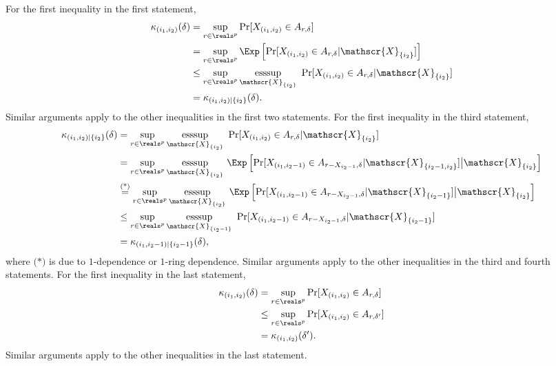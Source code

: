 \documentclass[aos]{imsart}
\begin{document}
\begin{appendix}
For the first inequality in the first statement,
\begin{equation*}
\begin{aligned}
    \kappa_{(i_1,i_2)}(\delta) 
    & = \sup_{r\in\reals^p} \Pr[{X}_{(i_1,i_2)} \in A_{r,\delta}] \\
    & = \sup_{r\in\reals^p} \Exp\left[ \Pr[{X}_{(i_1,i_2)} \in A_{r,\delta} | \mathscr{X}_{\{i_2\}}] \right] \\
    & \leq \sup_{r\in\reals^p} \underset{\mathscr{X}_{\{i_2\}}}{\mathrm{esssup}}
    ~ \Pr[{X}_{(i_1,i_2)} \in A_{r,\delta} | \mathscr{X}_{\{i_2\}}] \\
    & = \kappa_{(i_1,i_2)|\{i_2\}}(\delta). \\
\end{aligned}
\end{equation*}
Similar arguments apply to the other inequalities in the first two statements.
%
For the first inequality in the third statement,
\begin{equation*}
\begin{aligned}
    \kappa_{(i_1,i_2)|\{i_2\}}(\delta) 
    & = \sup_{r\in\reals^p} \underset{\mathscr{X}_{\{i_2\}}}{\mathrm{esssup}}
    ~ \Pr[{X}_{(i_1,i_2)} \in A_{r,\delta} | \mathscr{X}_{\{i_2\}}] \\
    & = \sup_{r\in\reals^p} \underset{\mathscr{X}_{\{i_2\}}}{\mathrm{esssup}}
    ~ \Exp\left[ 
        \Pr[{X}_{(i_1,i_2-1)} \in A_{r - X_{i_2-1},\delta} 
        | \mathscr{X}_{\{i_2-1, i_2\}}] 
    \big| \mathscr{X}_{\{i_2\}} \right] \\
    & \overset{\text{(*)}}{=} \sup_{r\in\reals^p} \underset{\mathscr{X}_{\{i_2\}}}{\mathrm{esssup}}
    ~ \Exp\left[ 
        \Pr[{X}_{(i_1,i_2-1)} \in A_{r - X_{i_2-1},\delta} 
        | \mathscr{X}_{\{i_2-1\}}] 
    \big| \mathscr{X}_{\{i_2\}} \right] \\
    & \leq \sup_{r\in\reals^p} 
    \underset{\mathscr{X}_{\{i_2-1\}}}{\mathrm{esssup}}
    ~ \Pr[{X}_{(i_1,i_2-1)} \in A_{r - X_{i_2-1},\delta} 
    | \mathscr{X}_{\{i_2-1\}}]  \\
    & = \kappa_{(i_1,i_2-1)|\{i_2-1\}}(\delta), \\
\end{aligned}
\end{equation*}
where $\text{(*)}$ is due to $1$-dependence or $1$-ring dependence.
Similar arguments apply to the other inequalities in the third and fourth statements. For the first inequality in the last statement,
\begin{equation*}
\begin{aligned}
    \kappa_{(i_1,i_2)}(\delta) 
    & = \sup_{r\in\reals^p} \Pr[{X}_{(i_1,i_2)} \in A_{r,\delta}] \\
    & \leq \sup_{r\in\reals^p} \Pr[{X}_{(i_1,i_2)} \in A_{r,\delta'}] \\
    & = \kappa_{(i_1,i_2)}(\delta'). \\
\end{aligned}
\end{equation*}
Similar arguments apply to the other inequalities in the last statement.


\end{appendix}
\end{document}
